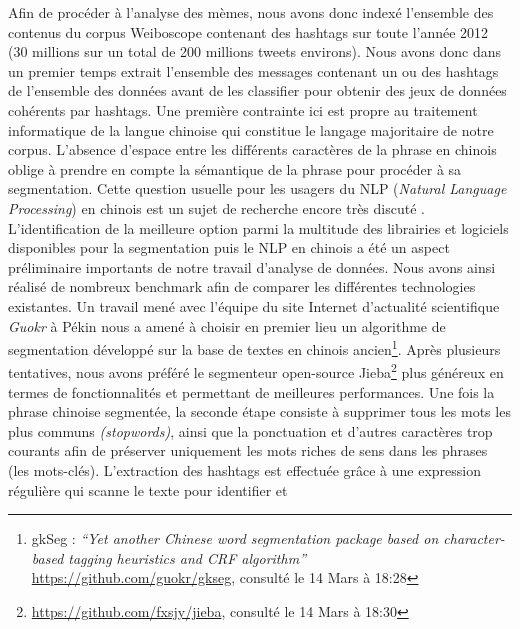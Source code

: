 Afin de proc\'eder \`a l{\textquoteright}analyse des m\`emes, nous avons
donc index\'e l{\textquoteright}ensemble des contenus du corpus
Weiboscope contenant des hashtags sur toute l{\textquoteright}ann\'ee
2012 (30 millions sur un total de 200 millions tweets environs). Nous
avons donc dans un premier temps extrait l{\textquoteright}ensemble des
messages contenant un ou des hashtags de l{\textquoteright}ensemble des
donn\'ees avant de les classifier pour obtenir des jeux de donn\'ees
coh\'erents par hashtags. Une premi\`ere contrainte ici est propre au
traitement informatique de la langue chinoise qui constitue le langage
majoritaire de notre corpus. L{\textquoteright}absence
d{\textquoteright}espace entre les diff\'erents caract\`eres de la
phrase en chinois oblige \`a prendre en compte la s\'emantique de la
phrase pour proc\'eder \`a sa segmentation. Cette question usuelle pour
les usagers du NLP (\textit{Natural Language Processing}) en chinois
est un sujet de recherche encore tr\`es discut\'e \cite{Qiu2013}.
L{\textquoteright}identification de la meilleure option parmi la
multitude des librairies et logiciels disponibles pour la segmentation
puis le NLP en chinois a \'et\'e un aspect pr\'eliminaire importants de
notre travail d{\textquoteright}analyse de donn\'ees. Nous avons ainsi
r\'ealis\'e de nombreux benchmark afin de comparer les diff\'erentes
technologies existantes. Un travail men\'e avec
l{\textquoteright}\'equipe du site Internet
d{\textquoteright}actualit\'e scientifique \textit{Guokr }\`a P\'ekin
nous a amen\'e \`a choisir en premier lieu un algorithme de
segmentation d\'evelopp\'e sur la base de textes en chinois
ancien\footnote{ gkSeg : \textit{{\textquotedblleft}Yet another Chinese
word segmentation package based on character-based tagging heuristics
and CRF algorithm{\textquotedblright}
}\url{https://github.com/guokr/gkseg}, consult\'e le 14 Mars \`a
18:28}. Apr\`es plusieurs tentatives, nous avons pr\'ef\'er\'e le
segmenteur open-source Jieba\footnote{
\url{https://github.com/fxsjy/jieba}, consult\'e le 14 Mars \`a 18:30}
plus g\'en\'ereux en termes de fonctionnalit\'es et permettant de
meilleures performances. Une fois la phrase chinoise segment\'ee, la
seconde \'etape consiste \`a supprimer tous les mots les plus communs
\textit{(stopwords)}, ainsi que la ponctuation et
d{\textquoteright}autres caract\`eres trop courants afin de pr\'eserver
uniquement les mots riches de sens dans les phrases (les mots-cl\'es).
L{\textquoteright}extraction des hashtags est effectu\'ee gr\^ace \`a
une expression r\'eguli\`ere qui scanne le texte pour identifier et
